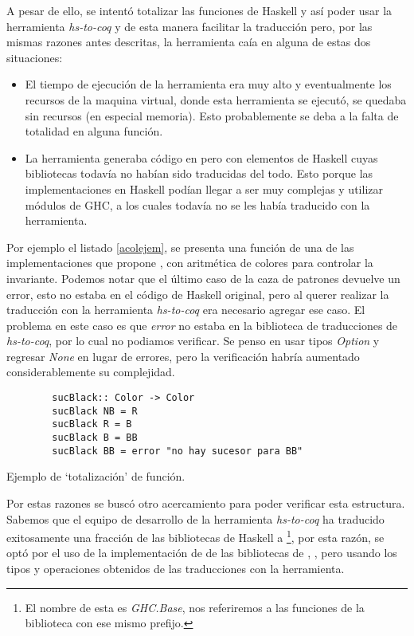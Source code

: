 A pesar de ello, se intent\'o totalizar las funciones de Haskell y así poder usar la herramienta 
\textit{hs-to-coq} y de esta manera facilitar la traducci\'on pero, por las mismas razones antes 
descritas, la herramienta caía en alguna de estas dos situaciones:

\begin{itemize}
    \item El tiempo de ejecuci\'on de la herramienta era muy alto y eventualmente los recursos de
    la maquina virtual, donde esta herramienta se ejecut\'o, se quedaba sin recursos (en
    especial memoria). Esto probablemente se deba a la falta de totalidad en alguna función.
    \item La herramienta generaba c\'odigo en {\coq} pero con elementos de Haskell cuyas bibliotecas
    todavía no habían sido traducidas del todo. Esto porque las implementaciones en Haskell pod\'ian
    llegar a ser muy complejas y utilizar módulos de GHC, a los cuales todav\'ia no se les hab\'ia
    traducido con la herramienta.
\end{itemize}{}

Por ejemplo el listado \ref{acolejem}, se presenta una funci\'on de una de las implementaciones que propone 
\cite{tesisG}, {\arns} con aritm\'etica de colores para controlar la invariante. Podemos notar que el \'ultimo
caso de la caza de patrones devuelve un error, esto no estaba en el c\'odigo de Haskell original, pero al querer 
realizar la traducci\'on con la herramienta \textit{hs-to-coq} era necesario agregar ese caso. El problema en 
este caso es que \textit{error} no estaba en la biblioteca de traducciones de \textit{hs-to-coq}, por lo cual no 
podiamos verificar. Se penso en usar tipos \textit{Option} y regresar \textit{None} en lugar de errores, pero la 
verificaci\'on habr\'ia aumentado considerablemente su complejidad.

\begin{listing}[!ht]
    \centering
    \captionsetup{justification=centering}
    \begin{verbatim}
        sucBlack:: Color -> Color
        sucBlack NB = R
        sucBlack R = B
        sucBlack B = BB
        sucBlack BB = error "no hay sucesor para BB"
    \end{verbatim}
    \caption{Ejemplo de `totalizaci\'on' de funci\'on.}
    \label{acolejem}
    \end{listing}

Por estas razones se busc\'o otro acercamiento para poder verificar esta estructura.
Sabemos que el equipo de desarrollo de la herramienta \textit{hs-to-coq} ha traducido exitosamente 
una fracci\'on de las bibliotecas de Haskell a {\coq}\footnote{El nombre de esta es 
\textit{GHC.Base}, nos referiremos a las funciones de la biblioteca con ese mismo prefijo.}, por 
esta raz\'on, se opt\'o por el uso de la implementación de {\arns} de las bibliotecas de {\coq}, 
\cite{MSetRBT}, pero usando los tipos y operaciones obtenidos de las traducciones con la herramienta.

